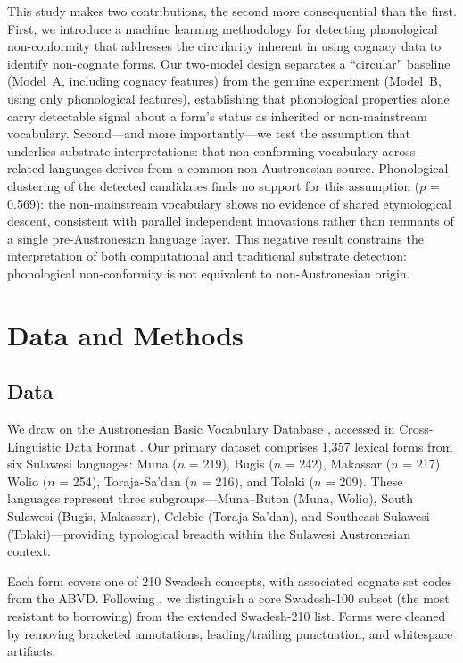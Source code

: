 \documentclass[12pt]{article}
\begin{document}
This study makes two contributions, the second more consequential than the first.
First, we introduce a machine learning methodology for detecting phonological non-conformity that addresses the circularity inherent in using cognacy data to identify non-cognate forms.
Our two-model design separates a ``circular'' baseline (Model~A, including cognacy features) from the genuine experiment (Model~B, using only phonological features), establishing that phonological properties alone carry detectable signal about a form's status as inherited or non-mainstream vocabulary.
Second---and more importantly---we test the assumption that underlies substrate interpretations: that non-conforming vocabulary across related languages derives from a common non-Austronesian source.
Phonological clustering of the detected candidates finds no support for this assumption ($p$ = 0.569): the non-mainstream vocabulary shows no evidence of shared etymological descent, consistent with parallel independent innovations rather than remnants of a single pre-Austronesian language layer.
This negative result constrains the interpretation of both computational and traditional substrate detection: phonological non-conformity is not equivalent to non-Austronesian origin.

\section{Data and Methods}

\subsection{Data}
\label{sec:data}

We draw on the Austronesian Basic Vocabulary Database \citep{greenhill2008}, accessed in Cross-Linguistic Data Format \citep[CLDF;][]{forkel2018}.
Our primary dataset comprises 1,357 lexical forms from six Sulawesi languages: Muna ($n$ = 219), Bugis ($n$ = 242), Makassar ($n$ = 217), Wolio ($n$ = 254), Toraja-Sa'dan ($n$ = 216), and Tolaki ($n$ = 209).
These languages represent three subgroups---Muna--Buton (Muna, Wolio), South Sulawesi (Bugis, Makassar), Celebic (Toraja-Sa'dan), and Southeast Sulawesi (Tolaki)---providing typological breadth within the Sulawesi Austronesian context.

Each form covers one of 210 Swadesh concepts, with associated cognate set codes from the ABVD.
Following \citet{swadesh1955}, we distinguish a core Swadesh-100 subset (the most resistant to borrowing) from the extended Swadesh-210 list.
Forms were cleaned by removing bracketed annotations, leading/trailing punctuation, and whitespace artifacts.
\end{document}
